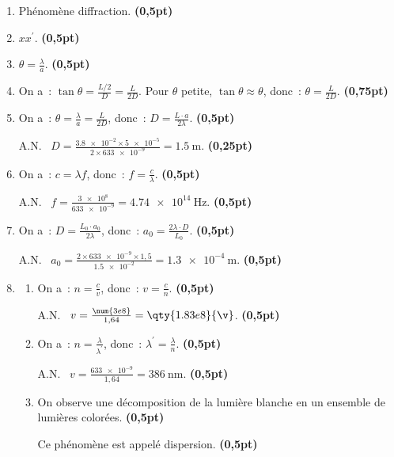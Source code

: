\begin{enumerate}
    \item Phénomène diffraction.
          \hfill\textbf{(0,5pt)}
    \item $xx^{\prime}$.
          \hfill\textbf{(0,5pt)}
    \item $\theta=\frac{\lambda}{a}$.
          \hfill\textbf{(0,5pt)}
    \item On a~: $\tan\theta=\frac{L/2}{D}=\frac{L}{2D}$.
          Pour $\theta$ petite, $\tan\theta\approx\theta$, donc~:
          $\theta=\frac{L}{2 D}$.
          \hfill\textbf{(0,75pt)}
    \item On a~: $\theta=\frac{\lambda}{a}=\frac{L}{2 D}$, donc~:
          $D=\frac{L \cdot a}{2\lambda}$.
          \hfill\textbf{(0,5pt)}

          A.N. \ $D=\frac{\num{3.8e-2}\times\num{5e-5}}{2\times\num{633e-9}}=
          \qty{1.5}{\meter}$.
          \hfill\textbf{(0,25pt)}
    \item On a~: $c=\lambda f$, donc~: $f=\frac{c}{\lambda}$.
          \hfill\textbf{(0,5pt)}

          A.N. \ $f=\frac{\num{3e8}}{\num{633e-9}}=\qty{4.74e14}{\hertz}$.
          \hfill\textbf{(0,5pt)}
    \item On a~: $D=\frac{L_{0} \cdot a_{0}}{2\lambda}$, donc~:
          $a_{0}=\frac{2\lambda\cdot D}{L_{0}}$.
          \hfill\textbf{(0,5pt)}

          A.N. \ $a_{0}=\frac{2\times\num{633e-9}\times 1,5}{\num{1.5e-2}}=
          \qty{1.3e-4}{\meter}$.
          \hfill\textbf{(0,5pt)}
    \item 
          \begin{enumerate}
              \item On a~: $n=\frac{c}{v}$, donc~: $v=\frac{c}{n}$.
                    \hfill\textbf{(0,5pt)}

                    A.N. \ $v=\frac{\num{3e8}}{1,64}=\qty{1.83e8}{\v}$.
                    \hfill\textbf{(0,5pt)}
              \item On a~: $n=\frac{\lambda}{\lambda^{\prime}}$, donc~:
                    $\lambda^{\prime}=\frac{\lambda}{n}$.
                    \hfill\textbf{(0,5pt)}

                    A.N. \ $v=\frac{\num{633e-9}}{1,64}=\qty{386}{\nm}$.
                    \hfill\textbf{(0,5pt)}
              \item On observe une décomposition de la lumière blanche en un
                    ensemble de lumières colorées.
                    \hfill\textbf{(0,5pt)}

                    Ce phénomène est appelé dispersion.
                    \hfill\textbf{(0,5pt)}
          \end{enumerate}
\end{enumerate}

